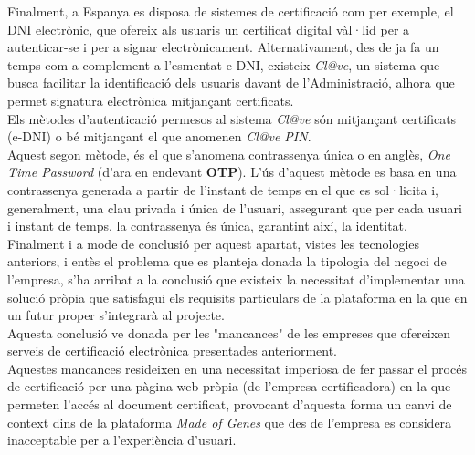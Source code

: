 \newline Finalment, a Espanya es disposa de sistemes de certificació com per exemple, el DNI electrònic, que ofereix als usuaris un certificat digital vàl·lid per a autenticar-se i per a signar electrònicament.
\newline Alternativament, des de ja fa un temps com a complement a l'esmentat e-DNI, existeix \textit{Cl@ve}, un sistema que busca facilitar la identificació dels usuaris davant de l'Administració, alhora que permet signatura electrònica mitjançant certificats.\\
\newline Els mètodes d'autenticació permesos al sistema \textit{Cl@ve} són mitjançant certificats (e-DNI) o bé mitjançant el que anomenen \textit{Cl@ve PIN}.\\
\newline Aquest segon mètode, és el que s'anomena contrassenya única o en anglès, \textit{One Time Password} (d'ara en endevant \textbf{OTP}). L'ús d'aquest mètode es basa en una contrassenya generada a partir de l'instant de temps en el que es sol·licita i, generalment, una clau privada i única de l'usuari, assegurant que per cada usuari i instant de temps, la contrassenya és única, garantint així, la identitat.\\
\newline Finalment i a mode de conclusió per aquest apartat, vistes les tecnologies anteriors, i entès el problema que es planteja donada la tipologia del negoci de l'empresa, s'ha arribat a la conclusió que existeix la necessitat d'implementar una solució pròpia que satisfagui els requisits particulars de la plataforma en la que en un futur proper s'integrarà al projecte.\\
\newline Aquesta conclusió ve donada per les "mancances" de les empreses que ofereixen serveis de certificació electrònica presentades anteriorment.\\
Aquestes mancances resideixen en una necessitat imperiosa de fer passar el procés de certificació per una pàgina web pròpia (de l'empresa certificadora) en la que permeten l'accés al document certificat, provocant d'aquesta forma un canvi de context dins de la plataforma \textit{Made of Genes} que des de l'empresa es considera inacceptable per a l'experiència d'usuari.